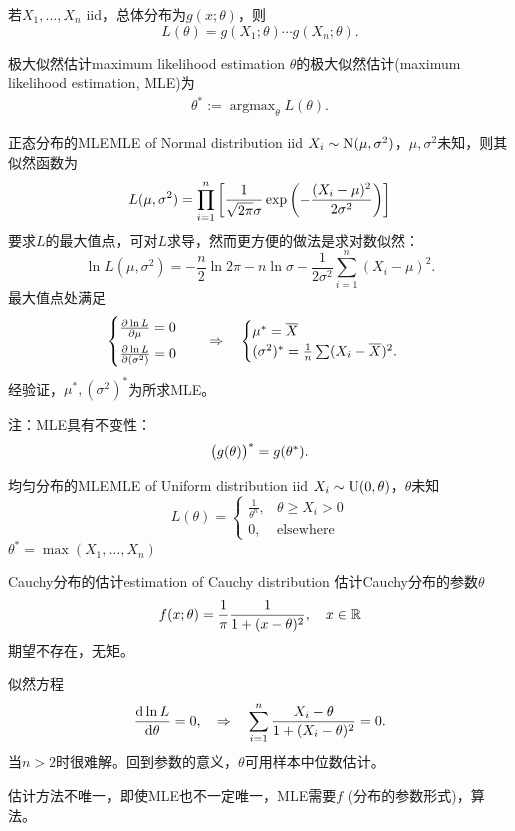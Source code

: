 若$X_1,\ldots,X_n$ iid，总体分布为$g(x;\theta)$，则
\[
	L(\theta)=g(X_1;\theta)\cdots g(X_n;\theta).
\]
\begin{definition}{极大似然估计}{maximum likelihood estimation}
	$\theta$的极大似然估计(maximum likelihood estimation, MLE)为
	\begin{align}
		\theta^\ast:=\mathop{\arg\max}_\theta L(\theta).
	\end{align}
\end{definition}
\begin{example}{正态分布的MLE}{MLE of Normal distribution}
	iid $X_i\sim\operatorname{N}(\mu,\sigma^2)$，$\mu,\sigma^2$未知，则其似然函数为
	\[
		L(\mu,\sigma^2)=\prod_{i=1}^n\left[\frac1{\sqrt{2\pi}\sigma}\exp\left(-\frac{(X_i-\mu)^2}{2\sigma^2}\right)\right]
	\]
	要求$L$的最大值点，可对$L$求导，然而更方便的做法是求对数似然：
	\[
		\ln L(\mu,\sigma^2)=-\frac n2\ln2\pi-n\ln\sigma-\frac1{2\sigma^2}\sum_{i=1}^n(X_i-\mu)^2.
	\]
	最大值点处满足
	\[
		\begin{cases}
			\pv{\ln L}\mu=0\\[1ex]
			\pv{\ln L}{(\sigma^2)}=0
		\end{cases}\thus
		\begin{cases}
			\mu^\ast=\avg X\\
			(\sigma^2)^\ast=\frac1n\sum(X_i-\avg X)^2.
		\end{cases}
	\]
	经验证，$\mu^\ast,(\sigma^2)^\ast$为所求MLE。
\end{example}
注：MLE具有不变性：
\begin{align}
	\bigl(g(\theta)\bigr)^\ast=g(\theta^\ast).
\end{align}
\begin{example}{均匀分布的MLE}{MLE of Uniform distribution}
	iid $X_i\sim\operatorname{U}(0,\theta)$，$\theta$未知
	\[
		L(\theta)=\begin{cases}
			\frac1{\theta^n},&\theta\geqslant X_i>0\\
			0,&\text{elsewhere}
		\end{cases}
	\]
	$\theta^\ast=\max(X_1,\ldots,X_n)$
\end{example}
\begin{example}{Cauchy分布的估计}{estimation of Cauchy distribution}
	估计Cauchy分布的参数$\theta$
	\[
		f(x;\theta)=\frac1\pi\frac1{1+(x-\theta)^2},\quad x\in\mathbb R
	\]
	期望不存在，无矩。
	
	似然方程
	\[
		\frac{\mathrm{d}^{\;\!\!}\ln L}{\mathrm{d} \theta^{\;\!\!}}=0,\quad\Rightarrow\quad\sum_{i=1}^n\frac{X_i-\theta}{1+(X_i-\theta)^2}=0.
	\]
	当$n>2$时很难解。回到参数的意义，$\theta$可用样本中位数估计。
\end{example}
估计方法不唯一，即使MLE也不一定唯一，MLE需要$f$ (分布的参数形式)，算法。

